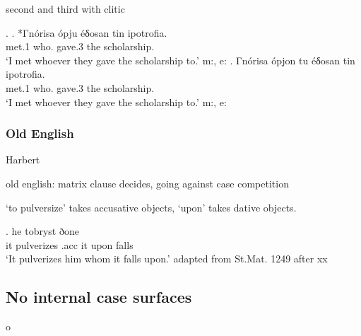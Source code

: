 second and third with clitic

\ex.
\ag. *Γnórisa ópju éδosan tin ipotrofia.\\
met.1 who. gave.3 the scholarship.\\
`I met whoever they gave the scholarship to.' \hfill m:, e:
\bg. Γnórisa ópjon tu éδosan tin ipotrofia.\\
met.1 who.  gave.3 the scholarship.\\
`I met whoever they gave the scholarship to.' \hfill m:, e:



\subsubsection{Old English}

Harbert

old english: matrix clause decides, going against case competition

 `to pulversize' takes accusative objects,  `upon' takes dative objects.

\exg. he tobryst ðone    \\
 it pulverizes\scsub{[acc]}  .\ac{acc}  it upon\scsub{[dat]} falls\\
`It pulverizes him whom it falls upon.' adapted from St.Mat. 1249 after xx

\subsection{No internal case surfaces}

o
%
%
